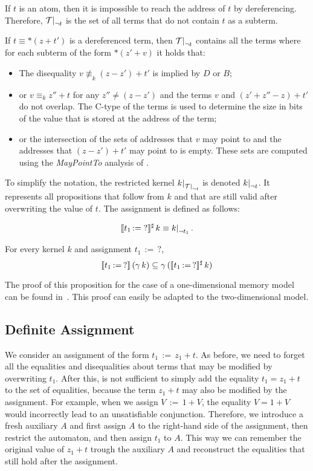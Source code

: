 If $t$ is an atom, then it is impossible to reach the address of $t$ by dereferencing.
Therefore, $\restr{\T}{\neg t}$ is the set of all terms that do not contain $t$ as a subterm.

If $t \equiv *(z + t')$ is a dereferenced term, then $\restr{\T}{\neg t}$ contains all the terms where for each subterm of the form $*(z' + v)$ it holds that:
\begin{itemize}
	\item\label{item:diseqs} The disequality $v \nequiv_k (z - z') + t'$ is implied by $D$ or $B$;
    \item\label{item:eqs} or $v \equiv_k z'' + t$ for any $z'' \neq (z - z')$ and the terms $v$ and $(z' + z'' - z) + t'$ do not overlap. The C-type of the terms is used to determine the size in bits of the value that is stored at the address of the term;
    \item or the intersection of the sets of addresses that $v$ may point to and the addresses that $(z - z') + t'$ may point to is empty.
    These sets are computed using the \emph{MayPointTo} analysis of \goblint.
\end{itemize}

To simplify the notation, the restricted kernel $\restr{k}{\restr{\T}{\neg t}}$ is denoted $\restr{k}{\neg t}$.
It represents all propositions that follow from $k$ and that are still valid after overwriting the value of $t$.
The assignment is defined as follows:

\[
	\sem{t_1\,{:=}\;?}^\sharp\,k \equiv \restr{k}{\neg t_1}.
\]

\begin{proposition}\label{p:ass-unknown}
	For every kernel $k$ and assignment $t_1\,{:=}\,?$,
	\[
		\llbracket t_1\,{:=}\,?\rrbracket\,(\gamma\,k) \subseteq \gamma\,(\llbracket t_1\,{:=}\,?\rrbracket^\sharp\,k)
	\]
\end{proposition}

The proof of this proposition for the case of a one-dimensional memory model can be found in~\cite{2pointer}.
This proof can easily be adapted to the two-dimensional model.

\subsection{Definite Assignment}

We consider an assignment of the form $t_1\,{:=}\,z_1+t$.
As before, we need to forget all the equalities and disequalities about terms that may be modified by overwriting $t_1$.
After this, is not sufficient to simply add the equality $t_1 = z_1+t$ to the set of equalities,
because the term $z_1 + t$ may also be modified by the assignment. For example, when we assign $V\,{:=}\,1+V$, the equality $V = 1 + V$ would incorrectly lead to an unsatisfiable conjunction.
Therefore, we introduce a fresh auxiliary $A$ and first assign $A$ to the right-hand side of the assignment, then restrict the automaton, and then assign $t_1$ to $A$.
This way we can remember the original value of $z_1 + t$ trough the auxiliary $A$ and reconstruct the equalities that still hold after the assignment.

